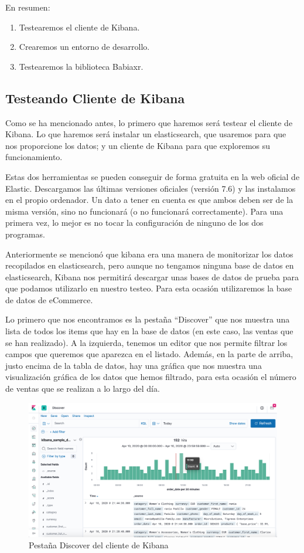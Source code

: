 \documentclass[a4paper, 12pt]{book}
\begin{document}
En resumen:
\begin{enumerate}
    \item Testearemos el cliente de Kibana.
    \item Crearemos un entorno de desarrollo.
    \item Testearemos la biblioteca Babiaxr.
\end{enumerate}


\subsection{Testeando Cliente de Kibana}

Como se ha mencionado antes, lo primero que haremos será testear el cliente de Kibana. Lo que haremos será instalar un elasticsearch, que usaremos para que nos proporcione los datos; y un cliente de Kibana para que exploremos su funcionamiento.

Estas dos herramientas se pueden conseguir de forma gratuita en la web oficial de Elastic. Descargamos las últimas versiones oficiales (versión 7.6) y las instalamos en el propio ordenador. Un dato a tener en cuenta es que ambos deben ser de la misma versión, sino no funcionará (o no funcionará correctamente). Para una primera vez, lo mejor es no tocar la configuración de ninguno de los dos programas.

Anteriormente se mencionó que kibana era una manera de monitorizar los datos recopilados en elasticsearch, pero aunque no tengamos ninguna base de datos en elasticsearch, Kibana nos permitirá descargar unas bases de datos de prueba para que podamos utilizarlo en nuestro testeo. Para esta ocasión utilizaremos la base de datos de eCommerce.

Lo primero que nos encontramos es la pestaña “Discover” que nos muestra una lista de todos los items que hay en la base de datos (en este caso, las ventas que se han realizado). A la izquierda, tenemos un editor que nos permite filtrar los campos que queremos que aparezca en el listado. Además, en la parte de arriba, justo encima de la tabla de datos, hay una gráfica que nos muestra una visualización gráfica de los datos que hemos filtrado, para esta ocasión el número de ventas que se realizan a lo largo del día.

\begin{figure}[H]
  \centering
  \includegraphics[width=12cm, keepaspectratio]{img/development/Discover-kibana.png}
  \caption{Pestaña Discover del cliente de Kibana}
  \label{fig:kibanadiscover}
\end{figure}
\end{document}

